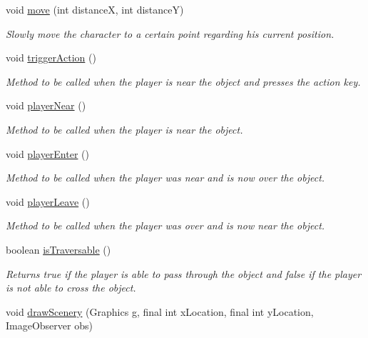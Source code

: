 \begin{DoxyCompactItemize}
void \hyperlink{classworld_1_1character_1_1_character_a69468dde4db9cb9e4ce0838dc6977c8c}{move} (int distance\-X, int distance\-Y)
\begin{DoxyCompactList}\small\item\em Slowly move the character to a certain point regarding his current position. \end{DoxyCompactList}\item 
void \hyperlink{classworld_1_1character_1_1_character_afcf977fccc24a077f5445e2a4e73836a}{trigger\-Action} ()
\begin{DoxyCompactList}\small\item\em Method to be called when the player is near the object and presses the action key. \end{DoxyCompactList}\item 
void \hyperlink{classworld_1_1character_1_1_character_a367d28c710b44853dd42daf2f35d1de8}{player\-Near} ()
\begin{DoxyCompactList}\small\item\em Method to be called when the player is near the object. \end{DoxyCompactList}\item 
void \hyperlink{classworld_1_1character_1_1_character_a9e727e0924694a8dcb032d6bb61b30d9}{player\-Enter} ()
\begin{DoxyCompactList}\small\item\em Method to be called when the player was near and is now over the object. \end{DoxyCompactList}\item 
void \hyperlink{classworld_1_1character_1_1_character_a94b4af7f2a48ad7288e64be4393ffeb2}{player\-Leave} ()
\begin{DoxyCompactList}\small\item\em Method to be called when the player was over and is now near the object. \end{DoxyCompactList}\item 
boolean \hyperlink{classworld_1_1character_1_1_character_afe899056167497ab0de734cd2f19219a}{is\-Traversable} ()
\begin{DoxyCompactList}\small\item\em Returns true if the player is able to pass through the object and false if the player is not able to cross the object. \end{DoxyCompactList}\item 
void \hyperlink{classworld_1_1scenery_1_1_scenery_a626c1ae7fa15d2f96d564c35368fdbc9}{draw\-Scenery} (Graphics g, final int x\-Location, final int y\-Location, Image\-Observer obs)
\end{DoxyCompactItemize}
